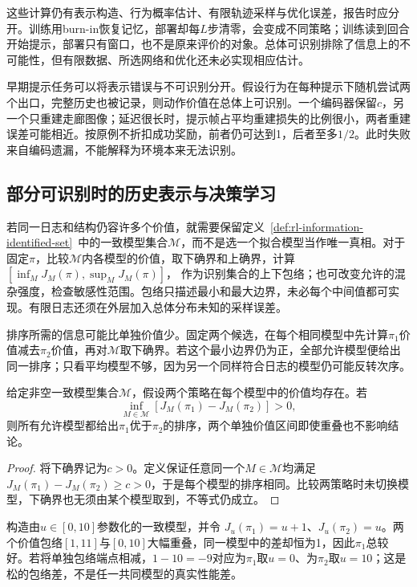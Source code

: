 这些计算仍有表示构造、行为概率估计、有限轨迹采样与优化误差，报告时应分开。训练用burn-in恢复记忆，部署却每$L$步清零，会变成不同策略；训练读到回合开始提示，部署只有窗口，也不是原来评价的对象。总体可识别排除了信息上的不可能性，但有限数据、所选网络和优化还未必实现相应估计。

早期提示任务可以将表示错误与不可识别分开。假设行为在每种提示下随机尝试两个出口，完整历史也被记录，则动作价值在总体上可识别。一个编码器保留$c$，另一个只重建走廊图像；延迟很长时，提示帧占平均重建损失的比例很小，两者重建误差可能相近。按原例不折扣成功奖励，前者仍可达到1，后者至多$1/2$。此时失败来自编码遗漏，不能解释为环境本来无法识别。

\subsection{部分可识别时的历史表示与决策学习}
\label{sec:rl-information-partial-identification}

若同一日志和结构仍容许多个价值，就需要保留定义~\ref{def:rl-information-identified-set}~中的一致模型集合$\mathcal M$，而不是选一个拟合模型当作唯一真相。对于固定$\pi$，比较$\mathcal M$内各模型的价值，取下确界和上确界，计算
$[\inf_MJ_M(\pi),\sup_MJ_M(\pi)]$，
作为识别集合的上下包络；也可改变允许的混杂强度，检查敏感性范围。包络只描述最小和最大边界，未必每个中间值都可实现。有限日志还须在外层加入总体分布未知的采样误差。

排序所需的信息可能比单独价值少。固定两个候选，在每个相同模型中先计算$\pi_1$价值减去$\pi_2$价值，再对$\mathcal M$取下确界。若这个最小边界仍为正，全部允许模型便给出同一排序；只看平均模型不够，因为另一个同样符合日志的模型仍可能反转次序。

\begin{theorem}[共同模型下的性能差确定排序]
  \label{thm:rl-information-partial-order}
  给定非空一致模型集合$\mathcal M$，假设两个策略在每个模型中的价值均存在。若
  \[
    \inf_{M\in\mathcal M}
          [J_M(\pi_1)-J_M(\pi_2)]>0,
  \]
  则所有允许模型都给出$\pi_1$优于$\pi_2$的排序，两个单独价值区间即使重叠也不影响结论。
\end{theorem}

\begin{proof}
  将下确界记为$c>0$。定义保证任意同一个$M\in\mathcal M$均满足
  $J_M(\pi_1)-J_M(\pi_2)\geq c>0$，于是每个模型的排序相同。比较两策略时未切换模型，下确界也无须由某个模型取到，不等式仍成立。
\end{proof}

\begin{example}
  \label{ex:rl-information-partial-order}
  构造由$u\in[0,10]$参数化的一致模型，并令
  $J_u(\pi_1)=u+1$、$J_u(\pi_2)=u$。两个价值包络$[1,11]$与$[0,10]$大幅重叠，同一模型中的差却恒为1，因此$\pi_1$总较好。若将单独包络端点相减，$1-10=-9$对应为$\pi_1$取$u=0$、为$\pi_2$取$u=10$；这是松的包络差，不是任一共同模型的真实性能差。
\end{example}


